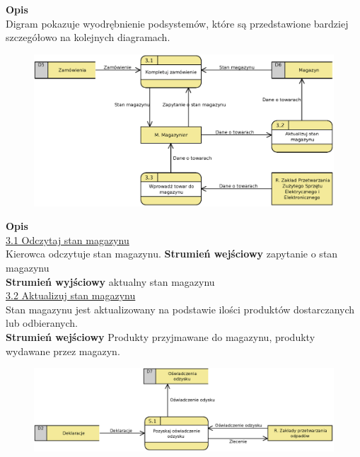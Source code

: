 \linespread{1.6}

\textbf{Opis}\\
Digram pokazuje wyodrębnienie podsystemów, które są przedstawione bardziej szczegółowo na kolejnych diagramach.


\begin{figure}[H]
	\centering
	\includegraphics[width=\textwidth]{img/DFD/2-level-magazyn.eps}
\end{figure}

\textbf{Opis} \\
\underline{3.1 Odczytaj stan magazynu}\\
Kierowca odczytuje stan magazynu.
\textbf{Strumień wejściowy} zapytanie o stan magazynu\\
\textbf{Strumień wyjściowy} aktualny stan magazynu\\

\underline{3.2 Aktualizuj stan magazynu}\\ 
Stan magazynu jest aktualizowany na podstawie ilości produktów dostarczanych lub odbieranych.\\	
\textbf{Strumień wejściowy} Produkty przyjmawane do magazynu, produkty wydawane przez magazyn.

\begin{figure}[H]
	\centering
	\includegraphics[width=\textwidth]{img/DFD/2-level-skup.eps}
\end{figure}